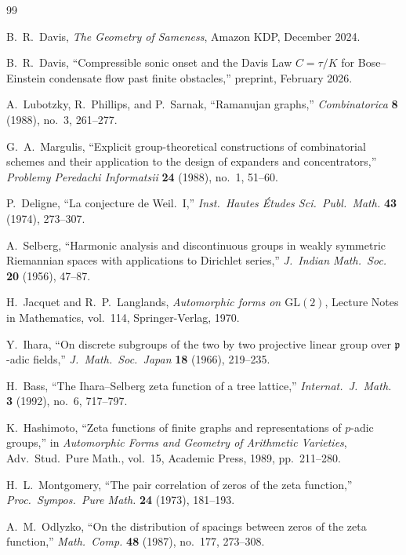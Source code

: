 \documentclass[12pt,reqno]{amsart}
\theoremstyle{plain}
\theoremstyle{definition}
\theoremstyle{remark}
\begin{document}
\begin{thebibliography}{99}

B.~R.~Davis,
\emph{The Geometry of Sameness},
Amazon KDP, December 2024.

B.~R.~Davis,
``Compressible sonic onset and the Davis Law $C = \tau/K$
for Bose--Einstein condensate flow past finite obstacles,''
preprint, February 2026.

A.~Lubotzky, R.~Phillips, and P.~Sarnak,
``Ramanujan graphs,''
\emph{Combinatorica} \textbf{8} (1988), no.~3, 261--277.

G.~A.~Margulis,
``Explicit group-theoretical constructions of combinatorial schemes
and their application to the design of expanders and concentrators,''
\emph{Problemy Peredachi Informatsii} \textbf{24} (1988), no.~1,
51--60.

P.~Deligne,
``La conjecture de Weil.~I,''
\emph{Inst.\ Hautes \'Etudes Sci.\ Publ.\ Math.} \textbf{43}
(1974), 273--307.

A.~Selberg,
``Harmonic analysis and discontinuous groups in weakly symmetric
Riemannian spaces with applications to Dirichlet series,''
\emph{J.~Indian Math.~Soc.} \textbf{20} (1956), 47--87.

H.~Jacquet and R.~P.~Langlands,
\emph{Automorphic forms on $\mathrm{GL}(2)$},
Lecture Notes in Mathematics, vol.~114, Springer-Verlag, 1970.

Y.~Ihara,
``On discrete subgroups of the two by two projective linear group
over $\mathfrak{p}$-adic fields,''
\emph{J.~Math.~Soc.~Japan} \textbf{18} (1966), 219--235.

H.~Bass,
``The Ihara--Selberg zeta function of a tree lattice,''
\emph{Internat.~J.~Math.} \textbf{3} (1992), no.~6, 717--797.

K.~Hashimoto,
``Zeta functions of finite graphs and representations of $p$-adic
groups,''
in \emph{Automorphic Forms and Geometry of Arithmetic Varieties},
Adv.~Stud.~Pure Math., vol.~15, Academic Press, 1989, pp.~211--280.

H.~L.~Montgomery,
``The pair correlation of zeros of the zeta function,''
\emph{Proc.~Sympos.~Pure Math.} \textbf{24} (1973), 181--193.

A.~M.~Odlyzko,
``On the distribution of spacings between zeros of the zeta
function,''
\emph{Math.~Comp.} \textbf{48} (1987), no.~177, 273--308.


\end{thebibliography}
\end{document}
